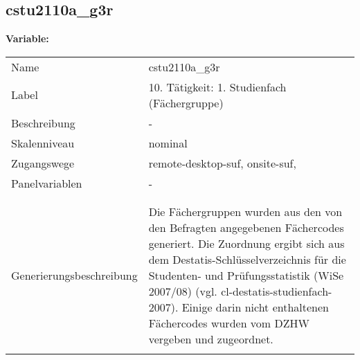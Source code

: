 	
	
	\subsection{cstu2110a\_g3r}
	\label{subSection:cstu2110a_g3r}

	\noindent\textbf{Variable:}\\
		\begin{tabular}{lL{11.3cm}}
			\label{tableVariable:cstu2110a_g3r}
			Name & cstu2110a\_g3r \\
			Label & 10. Tätigkeit: 1. Studienfach (Fächergruppe) \\
			Beschreibung & - \\
			Skalenniveau & nominal \\
			Zugangswege &
				remote-desktop-suf,
				onsite-suf,
 \\
			Panelvariablen & -
			 \\
			 \\
 \\
					Generierungsbeschreibung & Die Fächergruppen wurden aus den von den Befragten angegebenen Fächercodes generiert. Die Zuordnung ergibt sich aus dem Destatis-Schlüsselverzeichnis für die Studenten- und Prüfungsstatistik (WiSe 2007/08) (vgl. cl-destatis-studienfach-2007).  Einige darin nicht enthaltenen Fächercodes wurden vom DZHW vergeben und zugeordnet. 
				 \\	
			 \\
		\end{tabular}






